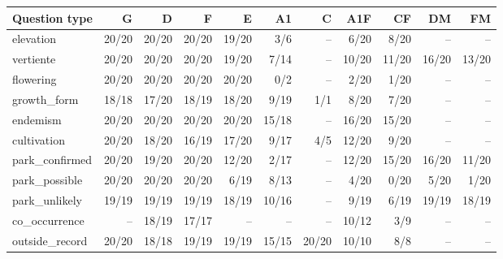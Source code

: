 \begin{tabular}{lrrrrrrrrrr}
\toprule
Question type & G & D & F & E & A1 & C & A1F & CF & DM & FM \\
\midrule
elevation & 20/20 & 20/20 & 20/20 & 19/20 & 3/6 & -- & 6/20 & 8/20 & -- & -- \\
vertiente & 20/20 & 20/20 & 20/20 & 19/20 & 7/14 & -- & 10/20 & 11/20 & 16/20 & 13/20 \\
flowering & 20/20 & 20/20 & 20/20 & 20/20 & 0/2 & -- & 2/20 & 1/20 & -- & -- \\
growth\_form & 18/18 & 17/20 & 18/19 & 18/20 & 9/19 & 1/1 & 8/20 & 7/20 & -- & -- \\
endemism & 20/20 & 20/20 & 20/20 & 20/20 & 15/18 & -- & 16/20 & 15/20 & -- & -- \\
cultivation & 20/20 & 18/20 & 16/19 & 17/20 & 9/17 & 4/5 & 12/20 & 9/20 & -- & -- \\
park\_confirmed & 20/20 & 19/20 & 20/20 & 12/20 & 2/17 & -- & 12/20 & 15/20 & 16/20 & 11/20 \\
park\_possible & 20/20 & 20/20 & 20/20 & 6/19 & 8/13 & -- & 4/20 & 0/20 & 5/20 & 1/20 \\
park\_unlikely & 19/19 & 19/19 & 19/19 & 18/19 & 10/16 & -- & 9/19 & 6/19 & 19/19 & 18/19 \\
co\_occurrence & -- & 18/19 & 17/17 & -- & -- & -- & 10/12 & 3/9 & -- & -- \\
outside\_record & 20/20 & 18/18 & 19/19 & 19/19 & 15/15 & 20/20 & 10/10 & 8/8 & -- & -- \\
\bottomrule
\end{tabular}
